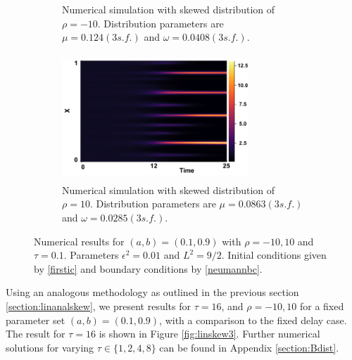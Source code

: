 \begin{figure}[H]
\begin{subfigure}[t]{0.45\textwidth}
        \caption{Numerical simulation with skewed distribution of $\rho=-10$. Distribution parameters are $\mu=0.124(3 s.f.)$ and $\omega=0.0408(3 s.f.)$.}
        \label{fig:rhom10}
    \end{subfigure}
    \hfill
    \begin{subfigure}[t]{0.45\textwidth}
        \centering
        \includegraphics[width=7cm,height=4.75cm]{skew10.png}
        \caption{Numerical simulation with skewed distribution of $\rho=10$. Distribution parameters are $\mu=0.0863(3 s.f.)$ and $\omega=0.0285(3 s.f.)$.}
        \label{fig:rho10}
    \end{subfigure}
    \caption{Numerical results for $(a,b)=(0.1,0.9)$ with $\rho=-10,10$ and $\tau=0.1$. Parameters $\epsilon^2=0.01$ and $L^2=9/2$. Initial conditions given by \eqref{firstic} and boundary conditions by \eqref{neumannbc}.}
    \label{fig:linskew1}
\end{figure}

 Using an analogous methodology as outlined in the previous section \ref{section:linanalskew}, we present results for $\tau=16$, and $\rho=-10,10$ for a fixed parameter set $(a,b)=(0.1,0.9)$, with a comparison to the fixed delay case. The result for $\tau=16$ is shown in Figure \ref{fig:linskew3}. Further numerical solutions for varying $\tau\in\{1,2,4,8\}$ can be found in Appendix \ref{section:Bdist}.

